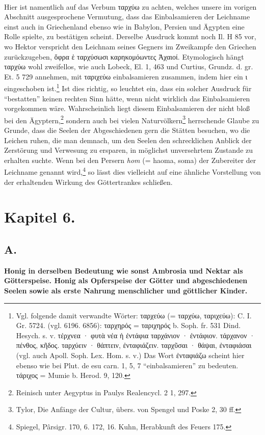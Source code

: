 \documentclass[a4paper, 11pt, oneside]{article}
\begin{document}
\paragraph{}
Hier ist namentlich auf das Verbum ταρχύω zu achten, welches unsere im vorigen Abschnitt ausgesprochene Vermutung, dass das Einbalsamieren der Leichname einst auch in Griechenland ebenso wie in Babylon, Persien und Ägypten eine Rolle spielte, zu bestätigen scheint. Derselbe Ausdruck kommt noch Il. Η 85 vor, wo Hektor verspricht den Leichnam seines Gegners im Zweikampfe den Griechen zurückzugeben, ὄφρα ἑ ταρχύσωσι καρηκομόωντες Ἀχαιοί. Etymologisch hängt ταρχύω wohl zweifellos, wie auch Lobeck, El. 1, 463 und Curtius, Grundz. d. gr. Et. 5 729 annehmen, mit ταριχεύω einbalsamieren zusammen, indem hier ein ι eingeschoben ist.\footnote{Vgl. folgende damit verwandte Wörter: ταρχεύω (= ταρχύω, ταριχεύω): C. I. Gr. 5724. (vgl. 6196. 6856): ταρχηρός = ταριχηρός b. Soph. fr. 531 Dind. Hesych. s. v. τέρχνεα · φυτὰ νέα ἡ ἐντάφια ταρχάνιον · ἐντάφιον. τάρχανον · πένθος, κῆδος. ταρχύειν · θάπτειν, ἐνταφιάζειν. ταρχῦσαι · θάψαι, ἐνταφιάσαι (vgl. auch Apoll. Soph. Lex. Hom. s. v.) Das Wort ἐνταφιάζω scheint hier ebenso wie bei Plut. de esu carn. 1, 5, 7 "`einbalsamieren"' zu bedeuten. τάριχος = Mumie b. Herod. 9, 120.} Ist dies richtig, so leuchtet ein, dass ein solcher Ausdruck für "`bestatten"' keinen rechten Sinn hätte, wenn nicht wirklich das Einbalsamieren vorgekommen wäre. Wahrscheinlich liegt diesem Einbalsamieren der nicht bloß bei den Ägyptern,\footnote{Reinisch unter Aegyptus in Paulys Realencycl. 2 1, 297.} sondern auch bei vielen Naturvölkern\footnote{Tylor, Die Anfänge der Cultur, übers. von Spengel und Poske 2, 30 ff.} herrschende Glaube zu Grunde, dass die Seelen der Abgeschiedenen gern die Stätten besuchen, wo die Leichen ruhen, die man demnach, um den Seelen den schrecklichen Anblick der Zerstörung und Verwesung zu ersparen, in möglichst unversehrtem Zustande zu erhalten suchte. Wenn bei den Persern \emph{hom} (= haoma, soma) der Zubereiter der Leichname genannt wird,\footnote{Spiegel, Pârsigr. 170, 6. 172, 16. Kuhn, Herabkunft des Feuers 175.} so lässt dies vielleicht auf eine ähnliche Vorstellung von der erhaltenden Wirkung des Göttertrankes schließen.
\clearpage
\section{Kapitel 6.}
\subsection{A.}
\begin{center}
\textbf{Honig in derselben Bedeutung wie sonst Ambrosia und Nektar als Götterspeise. Honig als Opferspeise der Götter und abgeschiedenen Seelen sowie als erste Nahrung menschlicher und göttlicher Kinder.}
\end{center}
\end{document}
